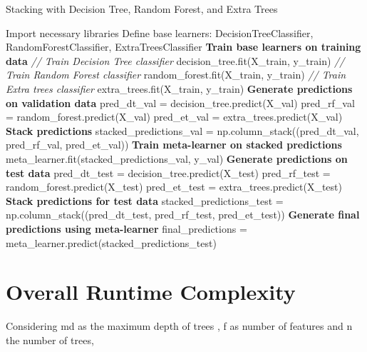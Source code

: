 \begin{algorithm}
\caption{Stacking with Decision Tree, Random Forest, and Extra Trees}
\label{alg:stacking}
\begin{algorithmic}[1]
    \State Import necessary libraries
    \State Define base learners: DecisionTreeClassifier, RandomForestClassifier, ExtraTreesClassifier
    \State \textbf{Train base learners on training data}
        \State \textit{// Train Decision Tree classifier}
        \State decision\_tree.fit(X\_train, y\_train)
        \State \textit{// Train Random Forest classifier}
        \State random\_forest.fit(X\_train, y\_train)
        \State \textit{// Train Extra trees classifier}
        \State extra\_trees.fit(X\_train, y\_train)
    \State \textbf{Generate predictions on validation data}
        \State pred\_dt\_val = decision\_tree.predict(X\_val)
        \State pred\_rf\_val = random\_forest.predict(X\_val)
        \State pred\_et\_val = extra\_trees.predict(X\_val)
    \State \textbf{Stack predictions}
        \State stacked\_predictions\_val = np.column\_stack((pred\_dt\_val, pred\_rf\_val, pred\_et\_val))
    \State \textbf{Train meta-learner on stacked predictions}
        \State meta\_learner.fit(stacked\_predictions\_val, y\_val)
    \State \textbf{Generate predictions on test data}
        \State pred\_dt\_test = decision\_tree.predict(X\_test)
        \State pred\_rf\_test = random\_forest.predict(X\_test)
        \State pred\_et\_test = extra\_trees.predict(X\_test)
    \State \textbf{Stack predictions for test data}
        \State stacked\_predictions\_test = np.column\_stack((pred\_dt\_test, pred\_rf\_test, pred\_et\_test))
    \State \textbf{Generate final predictions using meta-learner}
        \State final\_predictions = meta\_learner.predict(stacked\_predictions\_test)
\end{algorithmic}
\end{algorithm}

\pagebreak
\section{Overall Runtime Complexity}
Considering md as the maximum depth of trees , f as number of features and n the number of trees,
\begin{table}[htbp]
    \centering
    \caption{Overall Time Complexity}
\end{table}


